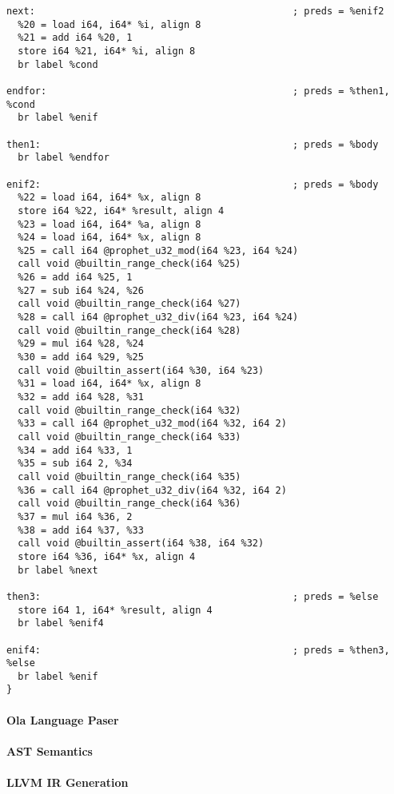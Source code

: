 \begin{lstlisting}[language={}]
next:                                             ; preds = %enif2
  %20 = load i64, i64* %i, align 8
  %21 = add i64 %20, 1
  store i64 %21, i64* %i, align 8
  br label %cond

endfor:                                           ; preds = %then1, %cond
  br label %enif

then1:                                            ; preds = %body
  br label %endfor

enif2:                                            ; preds = %body
  %22 = load i64, i64* %x, align 8
  store i64 %22, i64* %result, align 4
  %23 = load i64, i64* %a, align 8
  %24 = load i64, i64* %x, align 8
  %25 = call i64 @prophet_u32_mod(i64 %23, i64 %24)
  call void @builtin_range_check(i64 %25)
  %26 = add i64 %25, 1
  %27 = sub i64 %24, %26
  call void @builtin_range_check(i64 %27)
  %28 = call i64 @prophet_u32_div(i64 %23, i64 %24)
  call void @builtin_range_check(i64 %28)
  %29 = mul i64 %28, %24
  %30 = add i64 %29, %25
  call void @builtin_assert(i64 %30, i64 %23)
  %31 = load i64, i64* %x, align 8
  %32 = add i64 %28, %31
  call void @builtin_range_check(i64 %32)
  %33 = call i64 @prophet_u32_mod(i64 %32, i64 2)
  call void @builtin_range_check(i64 %33)
  %34 = add i64 %33, 1
  %35 = sub i64 2, %34
  call void @builtin_range_check(i64 %35)
  %36 = call i64 @prophet_u32_div(i64 %32, i64 2)
  call void @builtin_range_check(i64 %36)
  %37 = mul i64 %36, 2
  %38 = add i64 %37, %33
  call void @builtin_assert(i64 %38, i64 %32)
  store i64 %36, i64* %x, align 4
  br label %next

then3:                                            ; preds = %else
  store i64 1, i64* %result, align 4
  br label %enif4

enif4:                                            ; preds = %then3, %else
  br label %enif
}
\end{lstlisting}

\paragraph{Ola Language Paser}

\paragraph{AST Semantics}

\paragraph{LLVM IR Generation}
